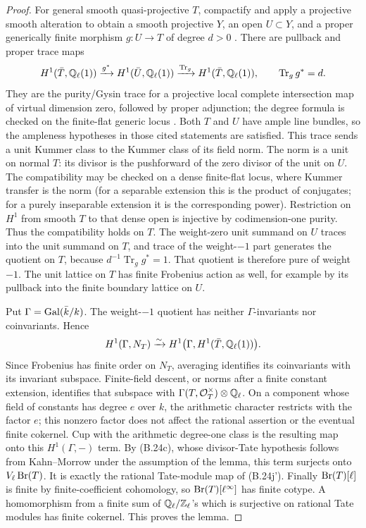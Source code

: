 \begin{proof}
For general smooth quasi-projective \(T\), compactify and apply a
projective smooth alteration to obtain a smooth projective
\(Y\), an open \(U\subset Y\), and a proper generically
finite morphism \(g:U\to T\) of degree \(d>0\)
\cite[Theorem~4.1 and Remark~4.2]{c_dejong1996}.
There are pullback and proper trace maps
\[
 H^1(\bar T,\mathbb Q_\ell(1))
  \xrightarrow{g^*}H^1(\bar U,\mathbb Q_\ell(1))
  \xrightarrow{\operatorname{Tr}_g}H^1(\bar T,\mathbb Q_\ell(1)),
 \qquad \operatorname{Tr}_g g^*=d.
\]
They are the purity/Gysin trace for a projective local complete
intersection map of virtual dimension zero, followed by proper
adjunction; the degree formula is checked on the finite-flat
generic locus
\cite[Corollary~3.1.2, Lemmas~3.5.8--3.5.10 and
Proposition~2.5.13]{c_riou2014}.
Both \(T\) and \(U\) have ample line bundles, so the
ampleness hypotheses in those cited statements are satisfied.
This trace sends a unit Kummer class to the Kummer class of
its field norm.  The norm is a unit on normal \(T\): its
divisor is the pushforward of the zero divisor of the unit
on \(U\).  The compatibility may be checked on a dense
finite-flat locus, where Kummer transfer is the norm
(for a separable extension this is the product of conjugates;
for a purely inseparable extension it is the corresponding
power).  Restriction on \(H^1\) from smooth \(T\) to
that dense open is injective by codimension-one purity.
Thus the compatibility holds on \(T\).
The weight-zero unit summand on \(U\) traces into the unit
summand on \(T\), and trace of the weight-\(-1\) part
generates the quotient on \(T\), because
\(d^{-1}\operatorname{Tr}_g g^*=1\).
That quotient is therefore pure of weight \(-1\).
The unit lattice on \(T\) has finite Frobenius action as
well, for example by its pullback into the finite boundary
lattice on \(U\).

Put \(\Gamma=\operatorname{Gal}(\bar k/k)\).
The weight-\(-1\) quotient has neither \(\Gamma\)-invariants
nor coinvariants.  Hence
\[
 H^1(\Gamma,N_T)\xrightarrow{\sim}
 H^1\bigl(\Gamma,H^1(\bar T,\mathbb Q_\ell(1))\bigr).
\]
Since Frobenius has finite order on \(N_T\), averaging
identifies its coinvariants with its invariant subspace.
Finite-field descent, or norms after a finite constant
extension, identifies that subspace with
\(\Gamma(T,\mathcal O_T^\times)\otimes\mathbb Q_\ell\).
On a component whose field of constants has degree \(e\)
over \(k\), the arithmetic character restricts with the
factor \(e\); this nonzero factor does not affect the
rational assertion or the eventual finite cokernel.
Cup with the arithmetic degree-one class is the resulting
map onto this \(H^1(\Gamma,-)\) term.
By (B.24c), whose divisor-Tate hypothesis follows from
Kahn--Morrow under the assumption of the lemma, this term
surjects onto \(V_\ell\operatorname{Br}(T)\).
It is exactly the rational Tate-module map of (B.24j').
Finally \(\operatorname{Br}(T)[\ell]\) is finite by finite-coefficient
cohomology, so \(\operatorname{Br}(T)[\ell^\infty]\) has finite cotype.
A homomorphism from a finite sum of
\(\mathbb Q_\ell/\mathbb Z_\ell\)'s which is surjective on rational
Tate modules has finite cokernel.  This proves the lemma.
\end{proof}
